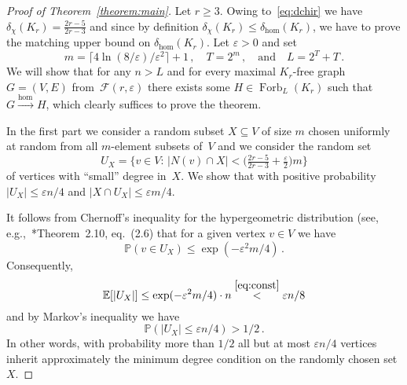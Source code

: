 \documentclass[reqno, 12pt]{amsart}
\theoremstyle{plain}
\theoremstyle{definition}
\let\eps=\varepsilon
\begin{document}
\begin{proof}[Proof of Theorem~\ref{theorem:main}]
	Let $r\geq 3$. Owing to~\eqref{eq:dchir} we have $\delta_{\chi}(K_r)=\frac{2r-5}{2r-3}$
	and since  by definition $\delta_{\chi}(K_r)\leq \delta_{\hom}(K_r)$, we have to prove the matching
	upper bound on $\delta_{\hom}(K_r)$. Let $\eps>0$ and set 
	\begin{equation}\label{eq:const}
		m=\lceil 4\ln(8/\eps)/\eps^2\rceil+1\,,\quad
		T=2^m\,,
		{\quad\text{and}\quad} 
		L=2^T+T\,.
	\end{equation}
	We will show that for any $n>L$ and for every maximal $K_r$-free graph $G=(V,E)$ from~${{\mathcal F}}(r,\eps)$
	there exists some $H\in\operatorname{Forb}_L(K_r)$ such that $G{\xrightarrow{\text{hom}\,}} H$, which clearly suffices to prove the theorem.
	
		In the first part we consider a random subset $X\subseteq V$ of size $m$ chosen uniformly at random
	from all $m$-element subsets of~$V$ and we consider the random set 
	\[
		U_X
		=
		\Big\{v\in V{\colon\,} |N(v)\cap X|<\big(\tfrac{2r-5}{2r-3}+\tfrac{\eps}{2}\big)m\Big\}
	\]
	of vertices with ``small'' degree in~$X$.
	We show that with positive probability $|U_X|\leq \eps n/4$ and $|X\cap U_X|\leq \eps m/4$.
	
	It follows from Chernoff's inequality for the hypergeometric 
	distribution (see, e.g.,~\cite{random-graphs}*{Theorem~2.10, eq.~(2.6)} that for a given vertex $v\in V$ we 
	have 
	\begin{equation}\label{eq:Xv}
		{\mathbb P}(v\in U_X)
		\leq
		\exp(-\eps^2m/4)\,.
	\end{equation}
	Consequently, 
	\[
		{\mathbb E}[|U_X|]
		\leq 
		\exp(-\eps^2m/4)\cdot n
		\overset{\eqref{eq:const}}{<} \eps n/8
	\]
	and by Markov's inequality we have 
	\begin{equation}\label{eq:X1}
		{\mathbb P}(|U_X|\leq \eps n/4)> 1/2\,.
	\end{equation}
	In other words, with probability more than $1/2$ all but at most $\eps n/4$
	vertices inherit approximately the minimum degree condition on the randomly chosen 
	set $X$. 
	

\end{proof}
\end{document}
